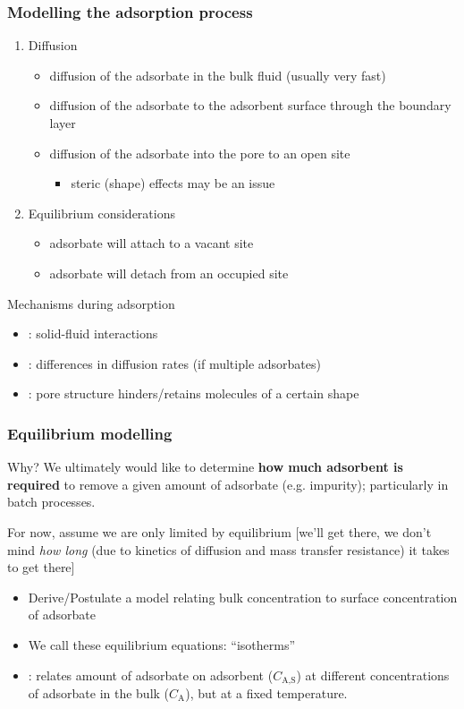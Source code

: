 \begin{frame}\frametitle{Modelling the adsorption process}
	\begin{enumerate}
		\item	Diffusion
			\begin{itemize}
				\item	diffusion of the adsorbate in the bulk fluid (usually very fast)
				\item	diffusion of the adsorbate to the adsorbent surface through the boundary layer
				\item	diffusion of the adsorbate into the pore to an open site
				\begin{itemize}
					\item	steric (shape) effects may be an issue
				\end{itemize}
			\end{itemize}
		\item	Equilibrium considerations
			\begin{itemize}
				\item	adsorbate will attach to a vacant site
				\item	adsorbate will detach from an occupied site
			\end{itemize}
	\end{enumerate}

	\vspace{12pt}
	Mechanisms during adsorption
	\begin{itemize}
		\item	{\color{purple}{equilibrium interaction}}: solid-fluid interactions
		\item	{\color{purple}{kinetic}}: differences in diffusion rates (if multiple adsorbates)
		\item	{\color{purple}{steric}}: pore structure hinders/retains molecules of a certain shape
	\end{itemize}
\end{frame}

\begin{frame}\frametitle{Equilibrium modelling}
	\begin{exampleblock}{Why?}
		We ultimately would like to determine \textbf{how much adsorbent is required} to remove a given amount of adsorbate (e.g. impurity); particularly in batch processes.
	\end{exampleblock}

	\vspace{12pt}
	For now, assume we are only limited by equilibrium [we'll get there, we don't mind \emph{how long} {\small (due to kinetics of diffusion and mass transfer resistance) }it takes to get there]
	\begin{itemize}
		\item	Derive/Postulate a model relating bulk concentration to surface concentration of adsorbate
		\item	We call these equilibrium equations: ``isotherms''
		\item	{\color{purple}{Isotherm}}: relates amount of adsorbate on adsorbent ($C_\text{A,S}$) at different concentrations of adsorbate in the bulk ($C_\text{A}$), but at a fixed temperature.
	\end{itemize}
\end{frame}

